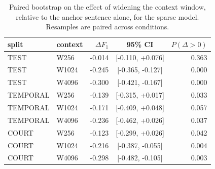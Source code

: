 \begin{table}[t]
\centering\scriptsize
\begin{tabular}{llrcr}
\toprule
split & context & $\Delta F_1$ & 95\% CI & $P(\Delta{>}0)$ \\
\midrule
TEST & W256 & -0.014 & [-0.110, +0.076] & 0.363 \\
TEST & W1024 & -0.245 & [-0.365, -0.127] & 0.000 \\
TEST & W4096 & -0.300 & [-0.421, -0.167] & 0.000 \\
TEMPORAL & W256 & -0.139 & [-0.315, +0.017] & 0.033 \\
TEMPORAL & W1024 & -0.171 & [-0.409, +0.048] & 0.057 \\
TEMPORAL & W4096 & -0.236 & [-0.462, +0.026] & 0.037 \\
COURT & W256 & -0.123 & [-0.299, +0.026] & 0.042 \\
COURT & W1024 & -0.216 & [-0.387, -0.055] & 0.004 \\
COURT & W4096 & -0.298 & [-0.482, -0.105] & 0.003 \\
\bottomrule
\end{tabular}
\caption{Paired bootstrap on the effect of widening the context window, relative to the anchor sentence alone, for the sparse model. Resamples are paired across conditions.}
\label{tab:context}
\end{table}
